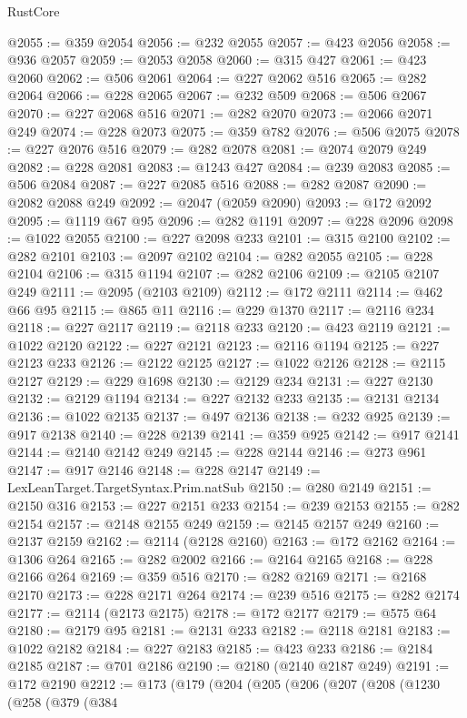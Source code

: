 \begin{lexlean}{RustCore}
\begin{coremodule}
@2055 := @359 @2054
@2056 := @232 @2055
@2057 := @423 @2056
@2058 := @936 @2057
@2059 := @2053 @2058
@2060 := @315 @427
@2061 := @423 @2060
@2062 := @506 @2061
@2064 := @227 @2062 @516
@2065 := @282 @2064
@2066 := @228 @2065
@2067 := @232 @509
@2068 := @506 @2067
@2070 := @227 @2068 @516
@2071 := @282 @2070
@2073 := @2066 @2071 @249
@2074 := @228 @2073
@2075 := @359 @782
@2076 := @506 @2075
@2078 := @227 @2076 @516
@2079 := @282 @2078
@2081 := @2074 @2079 @249
@2082 := @228 @2081
@2083 := @1243 @427
@2084 := @239 @2083
@2085 := @506 @2084
@2087 := @227 @2085 @516
@2088 := @282 @2087
@2090 := @2082 @2088 @249
@2092 := @2047 (@2059 @2090)
@2093 := @172 @2092
@2095 := @1119 @67 @95
@2096 := @282 @1191
@2097 := @228 @2096
@2098 := @1022 @2055
@2100 := @227 @2098 @233
@2101 := @315 @2100
@2102 := @282 @2101
@2103 := @2097 @2102
@2104 := @282 @2055
@2105 := @228 @2104
@2106 := @315 @1194
@2107 := @282 @2106
@2109 := @2105 @2107 @249
@2111 := @2095 (@2103 @2109)
@2112 := @172 @2111
@2114 := @462 @66 @95
@2115 := @865 @11
@2116 := @229 @1370
@2117 := @2116 @234
@2118 := @227 @2117
@2119 := @2118 @233
@2120 := @423 @2119
@2121 := @1022 @2120
@2122 := @227 @2121
@2123 := @2116 @1194
@2125 := @227 @2123 @233
@2126 := @2122 @2125
@2127 := @1022 @2126
@2128 := @2115 @2127
@2129 := @229 @1698
@2130 := @2129 @234
@2131 := @227 @2130
@2132 := @2129 @1194
@2134 := @227 @2132 @233
@2135 := @2131 @2134
@2136 := @1022 @2135
@2137 := @497 @2136
@2138 := @232 @925
@2139 := @917 @2138
@2140 := @228 @2139
@2141 := @359 @925
@2142 := @917 @2141
@2144 := @2140 @2142 @249
@2145 := @228 @2144
@2146 := @273 @961
@2147 := @917 @2146
@2148 := @228 @2147
@2149 := LexLeanTarget.TargetSyntax.Prim.natSub
@2150 := @280 @2149
@2151 := @2150 @316
@2153 := @227 @2151 @233
@2154 := @239 @2153
@2155 := @282 @2154
@2157 := @2148 @2155 @249
@2159 := @2145 @2157 @249
@2160 := @2137 @2159
@2162 := @2114 (@2128 @2160)
@2163 := @172 @2162
@2164 := @1306 @264
@2165 := @282 @2002
@2166 := @2164 @2165
@2168 := @228 @2166 @264
@2169 := @359 @516
@2170 := @282 @2169
@2171 := @2168 @2170
@2173 := @228 @2171 @264
@2174 := @239 @516
@2175 := @282 @2174
@2177 := @2114 (@2173 @2175)
@2178 := @172 @2177
@2179 := @575 @64
@2180 := @2179 @95
@2181 := @2131 @233
@2182 := @2118 @2181
@2183 := @1022 @2182
@2184 := @227 @2183
@2185 := @423 @233
@2186 := @2184 @2185
@2187 := @701 @2186
@2190 := @2180 (@2140 @2187 @249)
@2191 := @172 @2190
@2212 := @173
    (@179
      (@204
        (@205
          (@206
            (@207
              (@208
                (@1230
                  (@258
                    (@379
                      (@384

\end{coremodule}
\end{lexlean}

